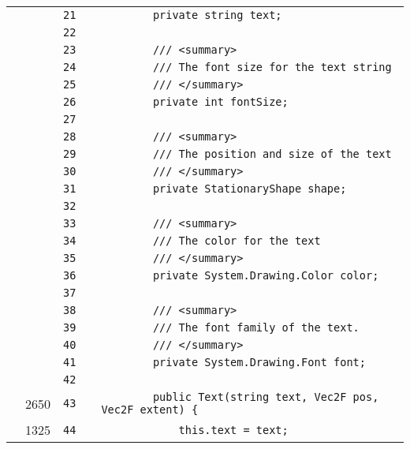 \documentclass[a4paper,landscape,10pt]{article}
\begin{document}
\begin{longtable}[l]{lrrll}
\cellcolor{gray} &  & \verb~21~ & & \verb~        private string text;~\\
\cellcolor{gray} &  & \verb~22~ & & \verb~~\\
\cellcolor{gray} &  & \verb~23~ & & \verb~        /// <summary>~\\
\cellcolor{gray} &  & \verb~24~ & & \verb~        /// The font size for the text string~\\
\cellcolor{gray} &  & \verb~25~ & & \verb~        /// </summary>~\\
\cellcolor{gray} &  & \verb~26~ & & \verb~        private int fontSize;~\\
\cellcolor{gray} &  & \verb~27~ & & \verb~~\\
\cellcolor{gray} &  & \verb~28~ & & \verb~        /// <summary>~\\
\cellcolor{gray} &  & \verb~29~ & & \verb~        /// The position and size of the text~\\
\cellcolor{gray} &  & \verb~30~ & & \verb~        /// </summary>~\\
\cellcolor{gray} &  & \verb~31~ & & \verb~        private StationaryShape shape;~\\
\cellcolor{gray} &  & \verb~32~ & & \verb~~\\
\cellcolor{gray} &  & \verb~33~ & & \verb~        /// <summary>~\\
\cellcolor{gray} &  & \verb~34~ & & \verb~        /// The color for the text~\\
\cellcolor{gray} &  & \verb~35~ & & \verb~        /// </summary>~\\
\cellcolor{gray} &  & \verb~36~ & & \verb~        private System.Drawing.Color color;~\\
\cellcolor{gray} &  & \verb~37~ & & \verb~~\\
\cellcolor{gray} &  & \verb~38~ & & \verb~        /// <summary>~\\
\cellcolor{gray} &  & \verb~39~ & & \verb~        /// The font family of the text.~\\
\cellcolor{gray} &  & \verb~40~ & & \verb~        /// </summary>~\\
\cellcolor{gray} &  & \verb~41~ & & \verb~        private System.Drawing.Font font;~\\
\cellcolor{gray} &  & \verb~42~ & & \verb~~\\
\cellcolor{green} & 2650 & \verb~43~ & & \verb~        public Text(string text, Vec2F pos, Vec2F extent) {~\\
\cellcolor{green} & 1325 & \verb~44~ & & \verb~            this.text = text;~\\

\end{longtable}
\end{document}
